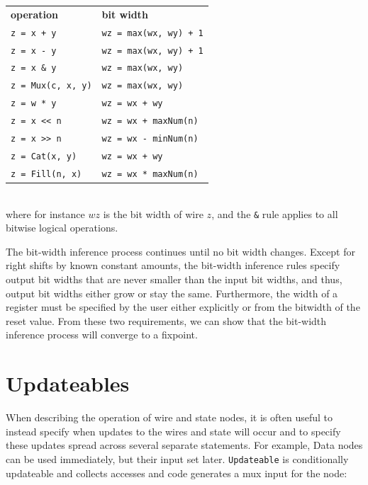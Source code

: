\documentclass[10pt,twocolumn]{article}
\def\code#1{{\small\tt #1}}
\begin{document}
{\footnotesize
\begin{tabular}{ll}
{\bf operation} & {\bf bit width} \\ 
\verb|z = x + y| & \verb|wz = max(wx, wy) + 1| \\
\verb+z = x - y+ & \verb|wz = max(wx, wy) + 1|\\
\verb+z = x & y+ & \verb+wz = max(wx, wy)+ \\
\verb+z = Mux(c, x, y)+ & \verb+wz = max(wx, wy)+ \\
\verb+z = w * y+ & \verb!wz = wx + wy! \\
\verb+z = x << n+ & \verb!wz = wx + maxNum(n)! \\
\verb+z = x >> n+ & \verb+wz = wx - minNum(n)+ \\
\verb+z = Cat(x, y)+ & \verb!wz = wx + wy! \\
\verb+z = Fill(n, x)+ & \verb+wz = wx * maxNum(n)+ \\
\end{tabular}
}
\\[1mm]
\noindent  
where for instance $wz$ is the bit width of wire $z$, and the \verb+&+
rule applies to all bitwise logical operations.

The bit-width inference process continues until no bit width changes.
Except for right shifts by known constant amounts, the bit-width
inference rules specify output bit widths that are never smaller than
the input bit widths, and thus, output bit widths either grow or stay
the same.  Furthermore, the width of a register must be specified by
the user either explicitly or from the bitwidth of the reset value.
From these two requirements, we can show that the bit-width inference
process will converge to a fixpoint.

\section{Updateables}

\label{sec:wires}

When describing the operation of wire and state
nodes, it is often useful to instead specify when updates to the
wires and state will occur and to specify these updates spread across
several separate statements.  
For example, Data nodes can be used immediately, but their input set later.
\code{Updateable} is conditionally updateable and 
collects accesses and code generates a mux input for the node:
\end{document}
